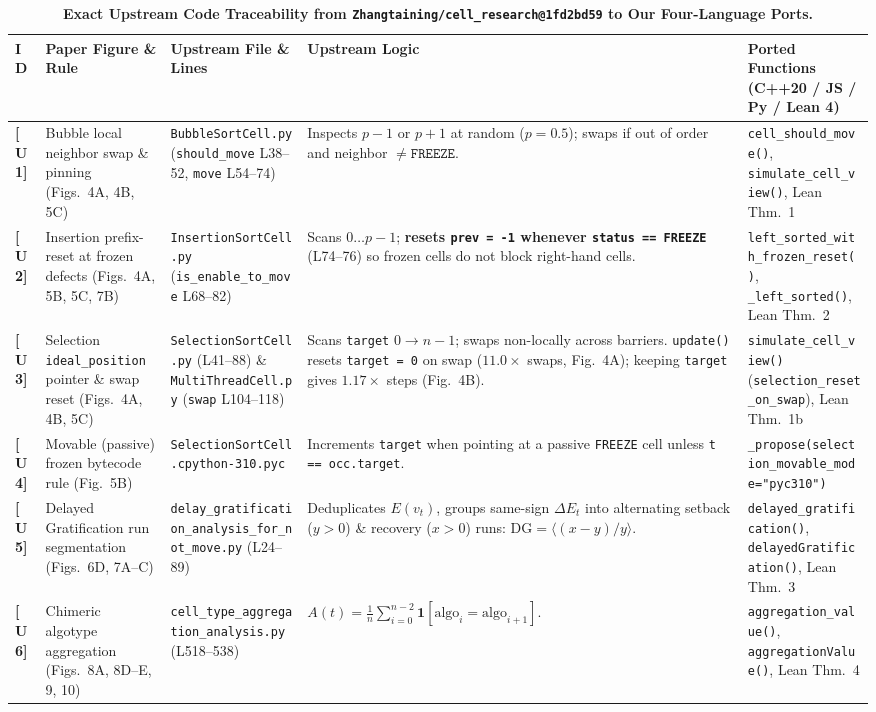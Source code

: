 \documentclass[11pt,a4paper]{article}
\theoremstyle{definition}
\theoremstyle{remark}
\newcommand{\DG}{\mathrm{DG}}
\begin{document}
\begin{table}[H]
\centering
\caption{\textbf{Exact Upstream Code Traceability from \texttt{Zhangtaining/cell\_research@1fd2bd59} to Our Four-Language Ports.}}
\label{tab:traceability}
\footnotesize
\renewcommand{\arraystretch}{1.22}
\begin{tabular}{p{} p{} p{} p{} p{}}
\toprule
\textbf{ID} & \textbf{Paper Figure \& Rule} & \textbf{Upstream File \& Lines} & \textbf{Upstream Logic} & \textbf{Ported Functions (C++20 / JS / Py / Lean 4)} \\
\midrule
\textbf{[U1]} & Bubble local neighbor swap \& pinning (Figs.~4A, 4B, 5C) & \texttt{BubbleSortCell.py} (\texttt{should\_move} L38--52, \texttt{move} L54--74) & Inspects $p-1$ or $p+1$ at random ($p=0.5$); swaps if out of order and neighbor $\neq \mathtt{FREEZE}$. & \texttt{cell\_should\_move()}, \texttt{simulate\_cell\_view()}, Lean Thm.~1 \\
\textbf{[U2]} & Insertion prefix-reset at frozen defects (Figs.~4A, 5B, 5C, 7B) & \texttt{InsertionSortCell.py} (\texttt{is\_enable\_to\_move} L68--82) & Scans $0 \dots p-1$; \textbf{resets \texttt{prev = -1} whenever \texttt{status == FREEZE}} (L74--76) so frozen cells do not block right-hand cells. & \texttt{left\_sorted\_with\_frozen\_reset()}, \texttt{\_left\_sorted()}, Lean Thm.~2 \\
\textbf{[U3]} & Selection \texttt{ideal\_position} pointer \& swap reset (Figs.~4A, 4B, 5C) & \texttt{SelectionSortCell.py} (L41--88) \& \texttt{MultiThreadCell.py} (\texttt{swap} L104--118) & Scans \texttt{target} $0 \to n-1$; swaps non-locally across barriers. \texttt{update()} resets \texttt{target = 0} on swap ($11.0\times$ swaps, Fig.~4A); keeping \texttt{target} gives $1.17\times$ steps (Fig.~4B). & \texttt{simulate\_cell\_view()} (\texttt{selection\_reset\_on\_swap}), Lean Thm.~1b \\
\textbf{[U4]} & Movable (passive) frozen bytecode rule (Fig.~5B) & \texttt{SelectionSortCell.\allowbreak cpython-310.pyc} & Increments \texttt{target} when pointing at a passive \texttt{FREEZE} cell unless \texttt{t == occ.target}. & \texttt{\_propose(selection\_\allowbreak movable\_mode="pyc310")} \\
\textbf{[U5]} & Delayed Gratification run segmentation (Figs.~6D, 7A--C) & \texttt{delay\_gratification\_\allowbreak analysis\_for\_not\_\allowbreak move.py} (L24--89) & Deduplicates $E(v_t)$, groups same-sign $\Delta E_t$ into alternating setback ($y>0$) \& recovery ($x>0$) runs: $\DG = \langle (x-y)/y \rangle$. & \texttt{delayed\_gratification()}, \texttt{delayedGratification()}, Lean Thm.~3 \\
\textbf{[U6]} & Chimeric algotype aggregation (Figs.~8A, 8D--E, 9, 10) & \texttt{cell\_type\_aggregation\_\allowbreak analysis.py} (L518--538) & $A(t) = \frac{1}{n}\sum_{i=0}^{n-2} \mathbf{1}[\mathrm{algo}_i = \mathrm{algo}_{i+1}]$. & \texttt{aggregation\_value()}, \texttt{aggregationValue()}, Lean Thm.~4 \\
\bottomrule
\end{tabular}
\end{table}
\end{document}

